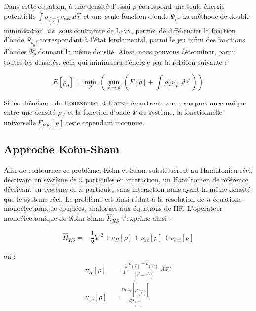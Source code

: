 Dans cette équation, à une densité d'essai $\rho$ correspond une seule énergie potentielle $\int \rho_{(\vec{r})} \nu_{ext} .d\vec{r}$ et une seule fonction d'onde $\Psi_{\rho}$. La méthode de double minimisation, \textit{i.e.} sous contrainte de \textsc{Levy}, permet de différencier la fonction d'onde $\Psi_{\rho_{0}}$, correspondant à l'état fondamental, parmi le jeu infini des fonctions d'ondes $\Psi_{\rho}$ donnant la même densité. Ainsi, nous pouvons déterminer, parmi toutes les densités, celle qui minimisera l'énergie par la relation suivante :

\begin{equation}
E[\rho_{0}] = \min\limits_{\rho}\, (\min\limits_{\Psi\rightarrow\rho}\, (F[\rho] + \int \rho_{\vec{r}} \nu_{\vec{r}}\, .d\vec{r}\, ))
\end{equation}

Si les théorèmes de \textsc{Hohenberg} et \textsc{Kohn} démontrent une correspondance unique entre une densité $\rho_{\vec{r}}$ et la fonction d'onde $\Psi$ du système, la fonctionnelle universelle $F_{HK}[\rho]$ reste cependant inconnue.

\subsection{Approche Kohn-Sham}\label{Kohn-Sham}

Afin de contourner ce problème, Kohn et Sham substituèrent au Hamiltonien réel, décrivant un système de $n$ particules en interaction, un Hamiltonien de référence décrivant un système de $n$ particules sans interaction mais ayant la même densité que le système réel. Le problème est ainsi réduit à la résolution de $n$ équations monoélectronique couplées, analogues aux équations de HF. L'opérateur monoélectronique de Kohn-Sham $\hat{K}_{KS}$ s'exprime ainsi :

\begin{equation}
\hat{H}_{KS} = -\frac{1}{2} \nabla^{2} + \nu_{H}[\rho] + \nu_{xc}[\rho] + \nu_{ext}[\rho]
\end{equation}

\noindent où :
\begin{align}
\nu_{H}[\rho] &= \int \frac{\rho_{(\vec{r})} - \rho_{(\vec{r}')}}{|\vec{r} - \vec{r}'|} .d\vec{r}' \\
\nu_{xc}[\rho] &= \frac{\partial E_{xc}[\rho_{(\vec{r})}]}{\partial\rho_{(\vec{r})}}
\end{align}

